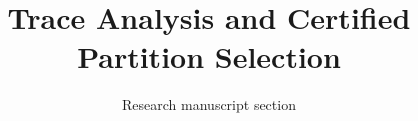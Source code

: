 \documentclass[runningheads]{llncs}
\begin{document}
\title{Trace Analysis and Certified Partition Selection}
\author{Research manuscript section}
\institute{}
\maketitle

\end{document}
